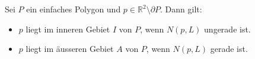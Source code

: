 \begin{definition}
    Sei $P$ ein einfaches Polygon und $p \in \mathbb{R}^2 \setminus \partial P$. 
    Dann gilt:
    \begin{itemize}
        \item $p$ liegt im inneren Gebiet $I$ von $P$, wenn $N(p,L)$ ungerade ist.
        \item $p$ liegt im äusseren Gebiet $A$ von $P$, wenn $N(p,L)$ gerade ist.
    \end{itemize}
\end{definition}